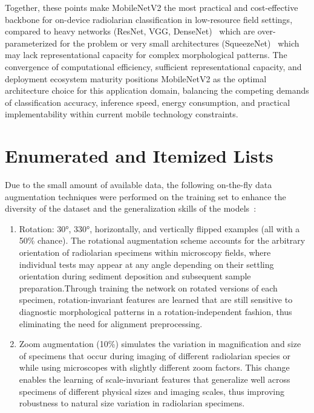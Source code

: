 \documentclass[a4paper,fleqn]{cas-sc}
\begin{document}
Together, these points make MobileNetV2 the most practical and cost-effective backbone for on-device radiolarian classification in low-resource field settings, compared to heavy networks (ResNet, VGG, DenseNet)~\cite{he2016deep,huang2017densenet} which are over-parameterized for the problem or very small architectures (SqueezeNet)~\cite{iandola2016squeezenet} which may lack representational capacity for complex morphological patterns. The convergence of computational efficiency, sufficient representational capacity, and deployment ecosystem maturity positions MobileNetV2 as the optimal architecture choice for this application domain, balancing the competing demands of classification accuracy, inference speed, energy consumption, and practical implementability within current mobile technology constraints.

\FloatBarrier

\section[Enumerated ...]{Enumerated and Itemized Lists}

Due to the small amount of available data, the following on-the-fly data augmentation techniques were performed on the training set to enhance the diversity of the dataset and the generalization skills of the models~\cite{li2022morphology}: 

\begin{enumerate}[1.]
\item Rotation: 30°, 330°, horizontally, and vertically flipped examples (all with a 50\% chance). The rotational augmentation scheme accounts for the arbitrary orientation of radiolarian specimens within microscopy fields, where individual tests may appear at any angle depending on their settling orientation during sediment deposition and subsequent sample preparation.Through training the network on rotated versions of each specimen, rotation-invariant features are learned that are still sensitive to diagnostic morphological patterns in a rotation-independent fashion, thus eliminating the need for alignment preprocessing.
\item Zoom augmentation (10\%) simulates the variation in magnification and size of specimens that occur during imaging of different radiolarian species or while using microscopes with slightly different zoom factors. This change enables the learning of scale-invariant features that generalize well across specimens of different physical sizes and imaging scales, thus improving robustness to natural size variation in radiolarian specimens.
\end{enumerate}
\end{document}
